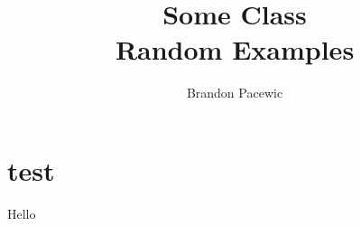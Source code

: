 \documentclass{report}
\title{\Huge{Some Class}\\Random Examples}
\author{\huge{Brandon Pacewic}}
\date{}
\begin{document}
\maketitle
\newpage
\tableofcontents
\pagebreak

\section{test}
Hello
\end{document}
